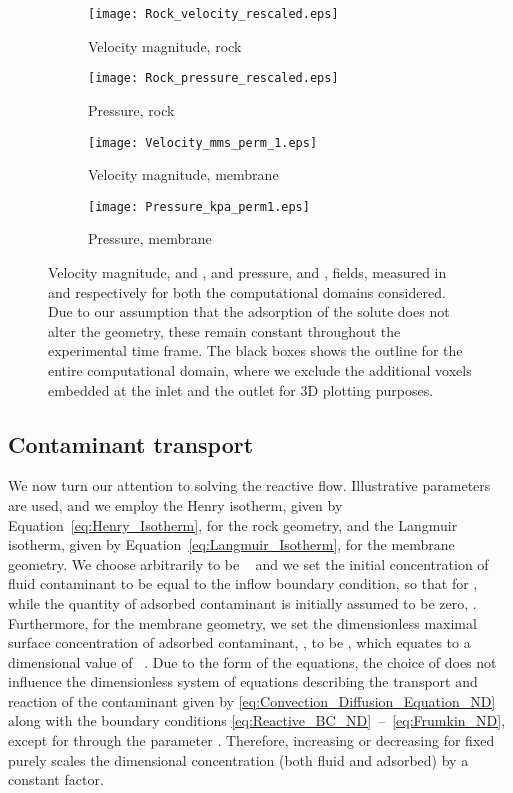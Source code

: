 \documentclass[preprint, 1p, authoryear]{elsarticle}
\begin{document}
\begin{figure}
\centering
\begin{subfigure}[c]{0.495\textwidth}
\texttt{[image: Rock\_velocity\_rescaled.eps]}
\caption{Velocity magnitude, rock}
\label{fig:Rock_velocity_rescaled}
\end{subfigure}
\begin{subfigure}[c]{0.495\textwidth}
\texttt{[image: Rock\_pressure\_rescaled.eps]}
\caption{Pressure, rock}
\label{fig:Rock_pressure_rescaled}
\end{subfigure}
\begin{subfigure}[c]{0.495\textwidth}
\texttt{[image: Velocity\_mms\_perm\_1.eps]}
\caption{Velocity magnitude, membrane}
\label{fig:Velocity_cut_perm_1_all}
\end{subfigure}
\begin{subfigure}[c]{0.495\textwidth}
\texttt{[image: Pressure\_kpa\_perm1.eps]}
\caption{Pressure, membrane}
\label{fig:Pressure_cut_perm_1_all}
\end{subfigure}
\caption{Velocity magnitude,  and ,  and pressure,  and ,  fields, measured in  and  respectively for both the computational domains considered.  Due to our assumption that the adsorption of the solute does not alter the geometry, these remain constant throughout the experimental time frame. The black boxes shows the outline for the entire computational domain, where we exclude the additional voxels embedded at the inlet and the outlet for 3D plotting purposes. }
\label{fig:Velocity_pressure}
\end{figure}


\subsection{Contaminant transport}
We now turn our attention to solving the reactive flow. 
Illustrative parameters are used, and we employ the Henry isotherm, given by Equation~\eqref{eq:Henry_Isotherm}, for the rock geometry, and the Langmuir isotherm, given by Equation~\eqref{eq:Langmuir_Isotherm},  for the membrane geometry.   We choose   arbitrarily to be ~ and we  set the initial concentration of fluid contaminant to be equal to the inflow boundary condition, so that  for , while the quantity of adsorbed contaminant is initially assumed to be zero, .  
Furthermore, for the membrane  geometry,  we set the dimensionless maximal surface concentration of adsorbed contaminant, , to be , which equates to a dimensional value of ~.  
Due to the form of the equations, the choice of  does not influence the dimensionless system of equations describing the transport and reaction of the contaminant given by \eqref{eq:Convection_Diffusion_Equation_ND} along with the boundary conditions \eqref{eq:Reactive_BC_ND}~--~\eqref{eq:Frumkin_ND}, except for through the parameter . Therefore, increasing or decreasing  for fixed  purely scales the dimensional  concentration (both fluid and adsorbed) by a constant factor. 
\end{document}
